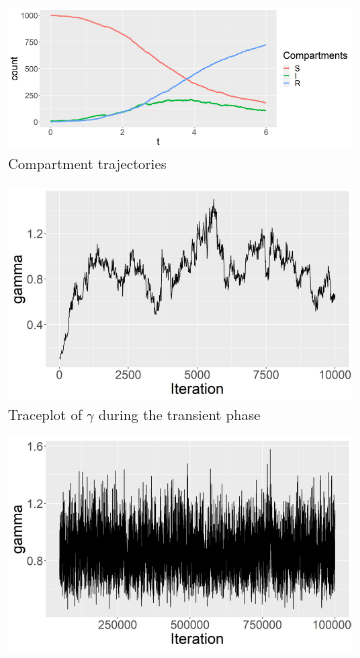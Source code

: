 \documentclass[11pt]{article}
\begin{document}
	\begin{figure}
		\centering
		\begin{subfigure}[b]{0.24\textwidth}
			\centering
			\includegraphics[width=\textwidth]{E1_trajectories}
			\caption{Compartment trajectories}
			\label{fig:E1_trajectories}
		\end{subfigure}
		\hfill
		\begin{subfigure}[b]{0.24\textwidth}
			\centering
			\includegraphics[width=\textwidth]{E1_short_no_burn_gamma_tp}
			\caption{Traceplot of $\gamma$ during the transient phase}
			\label{fig:E1_short_no_burn_gamma_tp}
		\end{subfigure}
		\hfill
		\begin{subfigure}[b]{0.24\textwidth}
			\centering
			\includegraphics[width=\textwidth]{E1_burn_gamma_tp}

\end{subfigure}
\end{figure}
\end{document}
